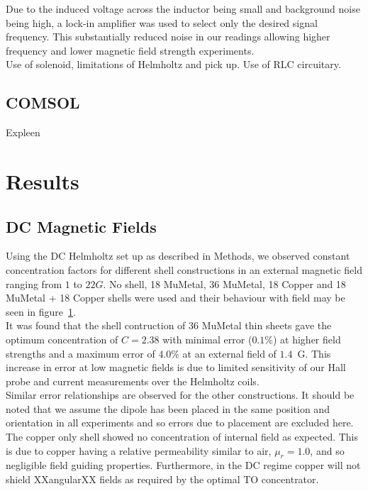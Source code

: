 \documentclass[11pt]{iopart}
\begin{document}
Due to the induced voltage across the inductor being small and background noise being high, a lock-in amplifier was used to select only the desired signal frequency. This substantially reduced noise in our readings allowing higher frequency and lower magnetic field strength experiments.\\

Use of solenoid, limitations of Helmholtz and pick up.
Use of RLC circuitary.

\subsection{COMSOL}
Expleen

\section{Results}
\subsection{DC Magnetic Fields}
\begin{figure}
  \caption{}
  \label{fig:DC_graph}
\end{figure}

Using the DC Helmholtz set up as described in Methods, we observed
constant concentration factors for different shell constructions in an
external magnetic field ranging from $1$ to $22 G$. No shell, 18
MuMetal, 36 MuMetal, 18 Copper and 18 MuMetal + 18 Copper shells were
used and their behaviour with field may be seen in
figure~\ref{fig:DC_graph}.\\ It was found that the shell contruction of 36
MuMetal thin sheets gave the optimum concentration of $C = 2.38$ with
minimal error ($0.1\%$) at higher field strengths and a maximum error
of $4.0\%$ at an external field of $1.4$~G. This increase in error at
low magnetic fields is due to limited sensitivity of our Hall probe
and current measurements over the Helmholtz coils.\\ Similar error
relationships are observed for the other constructions. It should be
noted that we assume the dipole has been placed in the same position
and orientation in all experiments and so errors due to placement are
excluded here.\\ The copper only shell showed no concentration of
internal field as expected. This is due to copper having a relative
permeability similar to air, $\mu_r = 1.0$, and so negligible field
guiding properties. Furthermore, in the DC regime copper will not
shield XXangularXX fields as required by the optimal TO
concentrator.\\
\end{document}
